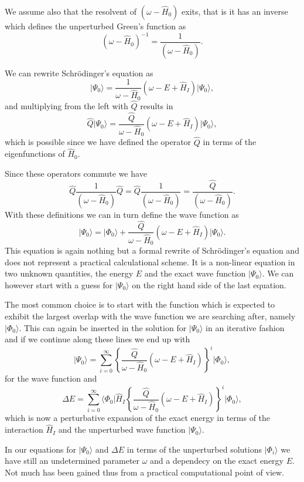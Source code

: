   We assume also that the resolvent of $\left(\omega-\hat{H}_0\right)$
  exits, that is it has an inverse which defines the unperturbed
  Green's function as
  \[
  \left(\omega-\hat{H}_0\right)^{-1}=\frac{1}{\left(\omega-\hat{H}_0\right)}.
  \]

  We can rewrite Schr\"odinger's equation as
  \[
  \vert
  \Psi_0\rangle=\frac{1}{\omega-\hat{H}_0}\left(\omega-E+\hat{H}_I\right)\vert
  \Psi_0\rangle,
  \]
  and multiplying from the left with $\hat{Q}$ results in
  \[
  \hat{Q}\vert
  \Psi_0\rangle=\frac{\hat{Q}}{\omega-\hat{H}_0}\left(\omega-E+\hat{H}_I\right)\vert
  \Psi_0\rangle,
  \]
  which is possible since we have defined the operator $\hat{Q}$ in
  terms of the eigenfunctions of $\hat{H}_0$.

 Since these operators commute we have
  \[
  \hat{Q}\frac{1}{\left(\omega-\hat{H}_0\right)}\hat{Q}=\hat{Q}\frac{1}{\left(\omega-\hat{H}_0\right)}=\frac{\hat{Q}}{\left(\omega-\hat{H}_0\right)}.
  \]
  With these definitions we can in turn define the wave function as
  \[
  \vert \Psi_0\rangle=\vert
  \Phi_0\rangle+\frac{\hat{Q}}{\omega-\hat{H}_0}\left(\omega-E+\hat{H}_I\right)\vert
  \Psi_0\rangle.
  \]
  This equation is again nothing but a formal rewrite of
  Schr\"odinger's equation and does not represent a practical
  calculational scheme.  It is a non-linear equation in two unknown
  quantities, the energy $E$ and the exact wave function $\vert
  \Psi_0\rangle$. We can however start with a guess for $\vert
  \Psi_0\rangle$ on the right hand side of the last equation.



   The most common choice is to start with the function which is
   expected to exhibit the largest overlap with the wave function we
   are searching after, namely $\vert \Phi_0\rangle$. This can again
   be inserted in the solution for $\vert \Psi_0\rangle$ in an
   iterative fashion and if we continue along these lines we end up
   with
  \[
  \vert
  \Psi_0\rangle=\sum_{i=0}^{\infty}\left\{\frac{\hat{Q}}{\omega-\hat{H}_0}\left(\omega-E+\hat{H}_I\right)\right\}^i\vert
  \Phi_0\rangle,
  \]
  for the wave function and
  \[
  \Delta E=\sum_{i=0}^{\infty}\langle \Phi_0\vert
  \hat{H}_I\left\{\frac{\hat{Q}}{\omega-\hat{H}_0}\left(\omega-E+\hat{H}_I\right)\right\}^i\vert
  \Phi_0\rangle,
  \]
  which is now a perturbative expansion of the exact energy in terms
  of the interaction $\hat{H}_I$ and the unperturbed wave function
  $\vert \Psi_0\rangle$.



  In our equations for $\vert \Psi_0\rangle$ and $\Delta E$ in terms
  of the unperturbed solutions $\vert \Phi_i\rangle$ we have still an
  undetermined parameter $\omega$ and a dependecy on the exact energy
  $E$. Not much has been gained thus from a practical computational
  point of view.

